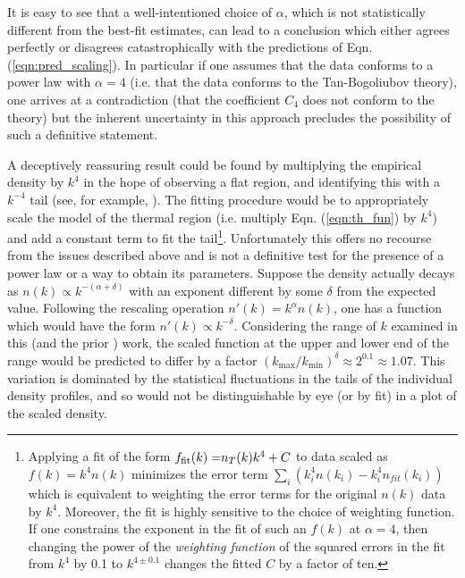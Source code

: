 	It is easy to see that a well-intentioned choice of $\alpha$, which is not statistically different from the best-fit estimates, can lead to a conclusion which either agrees perfectly or disagrees catastrophically with the predictions of Eqn. (\ref{eqn:pred_scaling}).
	In particular if one assumes that the data conforms to a power law with $\alpha=4$ (i.e. that the data conforms to the Tan-Bogoliubov theory), one arrives at a contradiction (that the coefficient $C_4$ does not conform to the theory) but the inherent uncertainty in this approach precludes the possibility of such a definitive statement.

	A deceptively reassuring result could be found by multiplying the empirical density by $k^4$ in the hope of observing a flat region, and identifying this with a $k^{-4}$ tail (see, for example, \cite{Makotyn14,Chang16}). %
	The fitting procedure would be to appropriately scale the model of the thermal region (i.e. multiply Eqn. (\ref{eqn:th_fun}) by $k^4$) and add a constant term to fit the tail\footnote{Applying a fit of the form ${f_{\rm fit}(k)=}n_T(k)k^4+C$ to data scaled as ${f(k)} = k^4 n(k)$ minimizes the error term $\sum_i (k_{i}^{4}n(k_i)-k_{i}^4n_{fit}(k_i))$ which is equivalent to weighting the error terms {for the original $n(k)$ data} by $k^4$. 
	Moreover, the fit is highly sensitive to the choice of weighting function.
	If one constrains the exponent in the fit {of such an $f(k)$} at $\alpha=4$, then changing the {power of the} \emph{weighting function} of the squared errors in the fit from {$k^4$} by 0.1 {to $k^{4\pm0.1}$} changes the fitted {$C$} by a factor of ten.}.
	Unfortunately this offers no recourse from the issues described above and is not a definitive test for the presence of a power law or a way to obtain its parameters.
	Suppose the density actually decays as $n(k) \propto k^{-(\alpha+\delta)}$ with an exponent different by some $\delta$ from the expected value.
	Following the rescaling operation $n'(k) = k^\alpha n(k)$, one has a {function} %
	which would have the form $n'(k) \propto k^{-\delta}$. 
	Considering the range of $k$ examined in this (and the prior \cite{Chang16}) work, the scaled {function} %
	at the upper and lower end of the range would be predicted to differ by a factor $(k_\textrm{max}/k_\textrm{min})^\delta \approx 2^{0.1}\approx1.07$.
	This variation is dominated by the statistical fluctuations in the tails of the individual density profiles, and so would not be distinguishable by eye (or by fit) in a plot of the scaled density.
	
